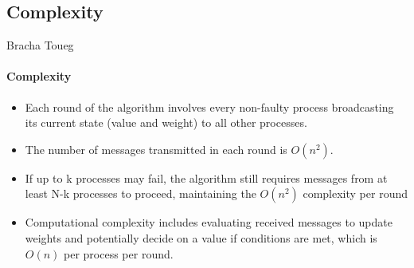 \documentclass[11pt]{beamer}              %
\begin{document}
\subsection{Complexity}
\begin{frame}{Bracha Toueg}
\framesubtitle{Complexity}
\begin{itemize}
    \item Each round of the algorithm involves every non-faulty process broadcasting its current state (value and weight) to all other processes.
    \item The number of messages transmitted in each round is \(O(n^2)\).
    \item If up to k processes may fail, the algorithm still requires messages from at least N-k processes to proceed, maintaining the \(O(n^2)\) complexity per round
    \item Computational complexity includes evaluating received messages to update weights and potentially decide on a value if conditions are met, which is \(O(n)\) per process per round.
\end{itemize}
\end{frame}
\end{document}
